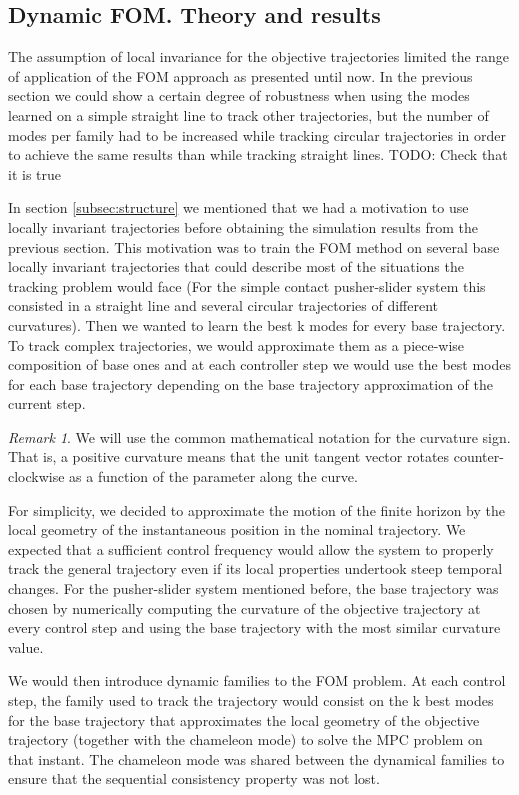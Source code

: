 \documentclass[12,twoside]{TFG-GM}
\theoremstyle{definition}
\theoremstyle{remark}
\newtheorem{remark}[theorem]{Remark}
\begin{document}
\subsection{Dynamic FOM. Theory and results}
\label{subsec:dynfom}
The assumption of local invariance for the objective trajectories limited the range of application of the FOM approach as presented until now. In the previous section we could show a certain degree of robustness when using the modes learned on a simple straight line to track other trajectories, but the number of modes per family had to be increased while tracking circular trajectories in order to achieve the same results than while tracking straight lines. TODO: Check that it is true

In section \ref{subsec:structure} we mentioned that we had a motivation to use locally invariant trajectories before obtaining the simulation results from the previous section. This motivation was to train the FOM method on several base locally invariant trajectories that could describe most of the situations the tracking problem would face (For the simple contact pusher-slider system this consisted in a straight line and several circular trajectories of different curvatures). Then we wanted to learn the best k modes for every base trajectory. To track complex trajectories, we would approximate them as a piece-wise composition of base ones and at each controller step we would use the best modes for each base trajectory depending on the base trajectory approximation of the current step.

\begin{remark}
We will use the common mathematical notation for the curvature sign. That is, a positive curvature means that the unit tangent vector rotates counter-clockwise as a function of the parameter along the curve.
\end{remark}

For simplicity, we decided to approximate the motion of the finite horizon by the local geometry of the instantaneous position in the nominal trajectory. We expected that a sufficient control frequency would allow the system to properly track the general trajectory even if its local properties undertook steep temporal changes. For the pusher-slider system mentioned before, the base trajectory was chosen by numerically computing the curvature of the objective trajectory at every control step and using the base trajectory with the most similar curvature value.

We would then introduce dynamic families to the FOM problem. At each control step, the family used to track the trajectory would consist on the k best modes for the base trajectory that approximates the local geometry of the objective trajectory (together with the chameleon mode) to solve the MPC problem on that instant. The chameleon mode was shared between the dynamical families to ensure that the sequential consistency property was not lost.
\end{document}
